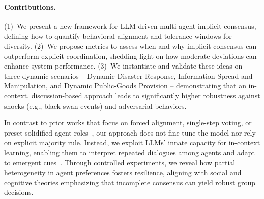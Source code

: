 \paragraph{Contributions.}

(1)~We present a new framework for LLM-driven multi-agent implicit consensus, defining how to quantify behavioral alignment and tolerance windows for diversity.  
(2)~We propose metrics to assess when and why implicit consensus can outperform explicit coordination, shedding light on how moderate deviations can enhance system performance.  
(3)~We instantiate and validate these ideas on three dynamic scenarios -- Dynamic Disaster Response, Information Spread and Manipulation, and Dynamic Public-Goods Provision -- demonstrating that an in-context, discussion-based approach leads to significantly higher robustness against shocks (e.g., black swan events) and adversarial behaviors.

In contrast to prior works that focus on forced alignment, single-step voting, or preset solidified agent roles~\cite{al2024project, li2023camel}, our approach does not fine-tune the model nor rely on explicit majority rule. Instead, we exploit LLMs' innate capacity for in-context learning, enabling them to interpret repeated dialogues among agents and adapt to emergent cues~\cite{han2023guinea,li2023camel,wu-etal-2024-shall,xing2024designing}. Through controlled experiments, we reveal how partial heterogeneity in agent preferences fosters resilience, aligning with social and cognitive theories emphasizing that incomplete consensus can yield robust group decisions.
